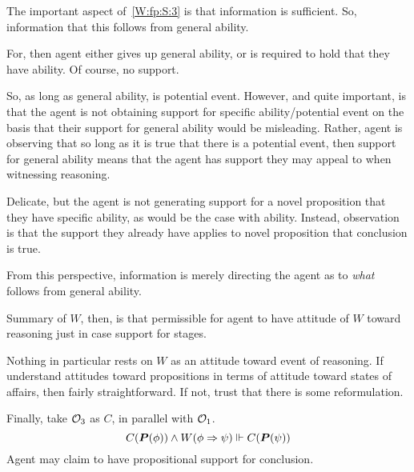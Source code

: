 \begin{note}[\(\geop{2}\)]
  The important aspect of~\ref{W:fp:S:3} is that information is sufficient.
  So, information that this follows from general ability.

  For, then agent either gives up general ability, or is required to hold that they have ability.
  Of course, no support.

  So, as long as general ability, is potential event.
  However, and quite important, is that the agent is not obtaining support for specific ability/potential event on the basis that their support for general ability would be misleading.
  Rather, agent is observing that so long as it is true that there is a potential event, then support for general ability means that the agent has support they may appeal to when witnessing reasoning.

  Delicate, but the agent is not generating support for a novel proposition that they have specific ability, as would be the case with ability.
  Instead, observation is that the support they already have applies to novel proposition that conclusion is true.

  From this perspective, information is merely directing the agent as to \emph{what} follows from general ability.

  Summary of \(W\), then, is that permissible for agent to have attitude of \(W\) toward reasoning just in case support for stages.
\end{note}

\begin{note}[\(W\) is an attitude?]
  Nothing in particular rests on \(W\) as an attitude toward event of reasoning.
  If understand attitudes toward propositions in terms of attitude toward states of affairs, then fairly straightforward.
  If not, trust that there is some reformulation.
\end{note}

\begin{note}[\(\geop{3}\)]
  Finally, take \(\geop{3}\) as \(C\), in parallel with \(\mathcal{O}_{1}\).
  \[C(\bm{P}(\phi)) \land W(\phi \Rightarrow{} \psi) \Vdash C(\bm{P}(\psi))\]
  Agent may claim to have propositional support for conclusion.
\end{note}

